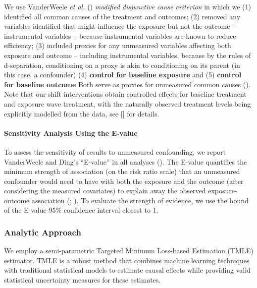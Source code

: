 \documentclass[
  singlecolumn]{article}
\let\oldparagraph\paragraph
\renewcommand{\paragraph}[1]{\oldparagraph{#1}\mbox{}}
\begin{document}
We use VanderWeele \emph{et al.} ()
\emph{modified disjunctive cause criterion} in which we (1) identified
all common causes of the treatment and outcomes; (2) removed any
variables identified that might influence the exposure but not the
outcome -- instrumental variables -- because instrumental variables are
known to reduce efficiency; (3) included proxies for any unmeasured
variables affecting both exposure and outcome -- including instrumental
variables, because by the rules of d-separation, conditioning on a proxy
is akin to conditioning on its parent (in this case, a confounder) (4)
\textbf{control for baseline exposure} and (5) \textbf{control for
baseline outcome} Both serve as proxies for unmeasured common causes
(). Note
that our shift interventions obtain controlled effects for baseline
treatment and exposure wave treatment, with the naturally observed
treatment levels being explicitly modelled from the data, see {[}{]} for
details.

\paragraph{Sensitivity Analysis Using the
E-value}\label{sensitivity-analysis-using-the-e-value}

To assess the sensitivity of results to unmeasured confounding, we
report VanderWeele and Ding's ``E-value'' in all analyses
(). The E-value
quantifies the minimum strength of association (on the risk ratio scale)
that an unmeasured confounder would need to have with both the exposure
and the outcome (after considering the measured covariates) to explain
away the observed exposure-outcome association
(;
). To
evaluate the strength of evidence, we use the bound of the E-value 95\%
confidence interval closest to 1.

\subsubsection{Analytic Approach}\label{analytic-approach}

We employ a semi-parametric Targeted Minimum Loss-based Estimation
(TMLE) estimator. TMLE is a robust method that combines machine learning
techniques with traditional statistical models to estimate causal
effects while providing valid statistical uncertainty measures for these
estimates.
\end{document}
